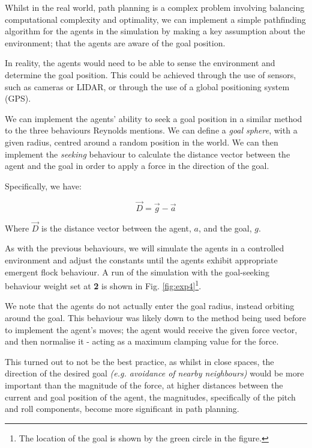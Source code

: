 \documentclass[12pt]{article}
\begin{document}
Whilst in the real world, path planning is a complex problem involving balancing computational complexity and optimality, we can implement a simple pathfinding algorithm for the agents in the simulation by making a key assumption about the environment; that the agents are aware of the goal position.

In reality, the agents would need to be able to sense the environment and determine the goal position. This could be achieved through the use of sensors, such as cameras or LIDAR, or through the use of a global positioning system (GPS)\cite{Petrillo,burwell_2019}.

We can implement the agents' ability to seek a goal position in a similar method to the three behaviours Reynolds mentions. We can define a \emph{goal sphere}, with a given radius, centred around a random position in the world. We can then implement the \emph{seeking} behaviour to calculate the distance vector between the agent and the goal in order to apply a force in the direction of the goal.

Specifically, we have:

\begin{equation}
\vec{D} = \vec{g} - \vec{a}
\end{equation}
    
Where $\vec{D}$ is the distance vector between the agent, $a$, and the goal, $g$.

As with the previous behaviours, we will simulate the agents in a controlled environment and adjust the constants until the agents exhibit appropriate emergent flock behaviour. A run of the simulation with the goal-seeking behaviour weight set at \textbf{2} is shown in Fig. \ref{fig:exp4}\footnote{The location of the goal is shown by the green circle in the figure.}. 

We note that the agents do not actually enter the goal radius, instead orbiting around the goal. This behaviour was likely down to the method being used before to implement the agent's moves; the agent would receive the given force vector, and then normalise it - acting as a maximum clamping value for the force. 

This turned out to not be the best practice, as whilst in close spaces, the direction of the desired goal \emph{(e.g. avoidance of nearby neighbours)} would be more important than the magnitude of the force, at higher distances between the current and goal position of the agent, the magnitudes, specifically of the pitch and roll components, become more significant in path planning. 
\end{document}
